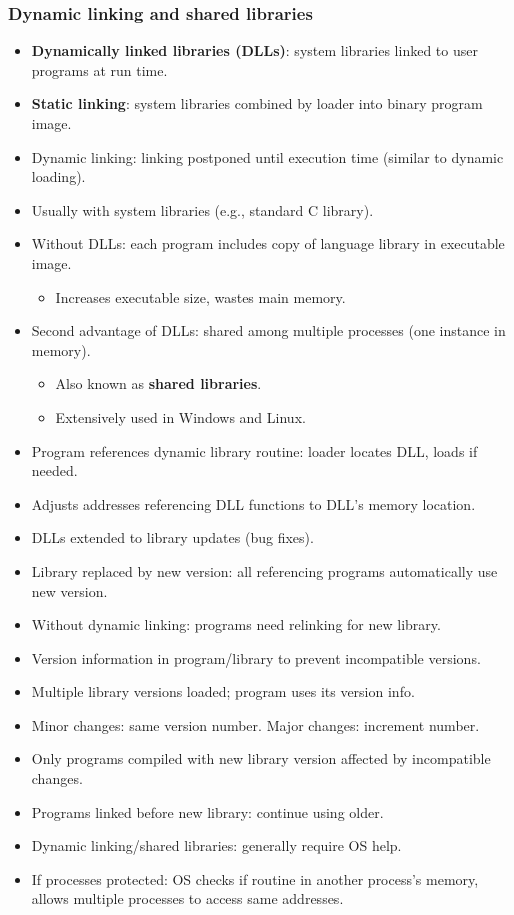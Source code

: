 \subsubsection*{Dynamic linking and shared libraries}
\begin{itemize}
    \item \textbf{Dynamically linked libraries (DLLs)}: system libraries linked to user programs at run time.
    \item \textbf{Static linking}: system libraries combined by loader into binary program image.
    \item Dynamic linking: linking postponed until execution time (similar to dynamic loading).
    \item Usually with system libraries (e.g., standard C library).
    \item Without DLLs: each program includes copy of language library in executable image.
    \begin{itemize}
        \item Increases executable size, wastes main memory.
    \end{itemize}
    \item Second advantage of DLLs: shared among multiple processes (one instance in memory).
    \begin{itemize}
        \item Also known as \textbf{shared libraries}.
        \item Extensively used in Windows and Linux.
    \end{itemize}
    \item Program references dynamic library routine: loader locates DLL, loads if needed.
    \item Adjusts addresses referencing DLL functions to DLL's memory location.
    \item DLLs extended to library updates (bug fixes).
    \item Library replaced by new version: all referencing programs automatically use new version.
    \item Without dynamic linking: programs need relinking for new library.
    \item Version information in program/library to prevent incompatible versions.
    \item Multiple library versions loaded; program uses its version info.
    \item Minor changes: same version number. Major changes: increment number.
    \item Only programs compiled with new library version affected by incompatible changes.
    \item Programs linked before new library: continue using older.
    \item Dynamic linking/shared libraries: generally require OS help.
    \item If processes protected: OS checks if routine in another process's memory, allows multiple processes to access same addresses.
\end{itemize}


